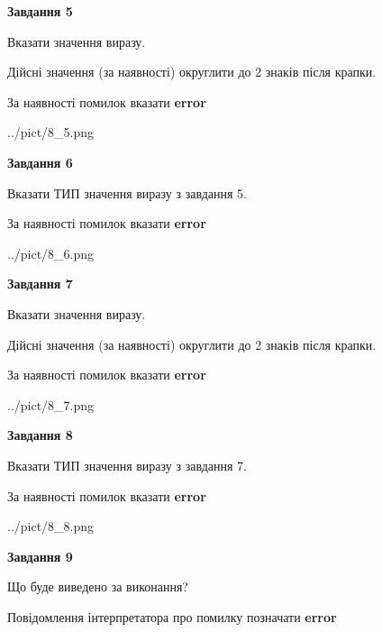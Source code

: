 \documentclass[11pt, ukrainian]{article}
\begin{document}
{\begin {large}
{\begin {center}\textbf{Завдання 5}\end {center}}\par
Вказати значення виразу. \par
Дійсні значення (за наявності) округлити до 2 знаків після крапки. \par
За наявності помилок вказати \textbf{error}

\begin{center}
	{../pict/8_5.png}
\end{center}
\newpage

{\begin {center}\textbf{Завдання 6}\end {center}}\par
Вказати ТИП значення виразу з завдання 5. \par
За наявності помилок вказати \textbf{error}

\begin{center}
	{../pict/8_6.png}
\end{center}
\newpage

{\begin {center}\textbf{Завдання 7}\end {center}}\par
Вказати значення виразу. \par
Дійсні значення (за наявності) округлити до 2 знаків після крапки. \par
За наявності помилок вказати \textbf{error}

\begin{center}
	{../pict/8_7.png}
\end{center}
\newpage

{\begin {center}\textbf{Завдання 8}\end {center}}\par
Вказати ТИП значення виразу з завдання 7. \par
За наявності помилок вказати \textbf{error}

\begin{center}
	{../pict/8_8.png}
\end{center}
\newpage

{\begin {center}\textbf{Завдання 9}\end {center}}\par
Що буде виведено за виконання? \par
Повідомлення інтерпретатора про помилку позначати \textbf{error}


\end{large}}
\end{document}
